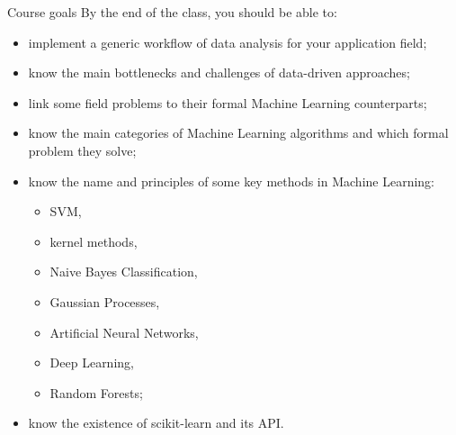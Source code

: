 \documentclass{beamer}
\begin{document}
\begin{frame}{Course goals}
\small
By the end of the class, you should be able to:
\begin{itemize}
\item implement a generic workflow of data analysis for your application field;
\item know the main bottlenecks and challenges of data-driven approaches;
\item link some field problems to their formal Machine Learning counterparts;
\item know the main categories of Machine Learning algorithms and which formal problem they solve;
\item know the name and principles of some key methods in Machine Learning:
\begin{itemize}
\item SVM,
\item kernel methods,
\item Naive Bayes Classification,
\item Gaussian Processes,
\item Artificial Neural Networks,
\item Deep Learning,
\item Random Forests;
\end{itemize} 
\item know the existence of scikit-learn and its API.
\end{itemize}
\end{frame}
\end{document}
